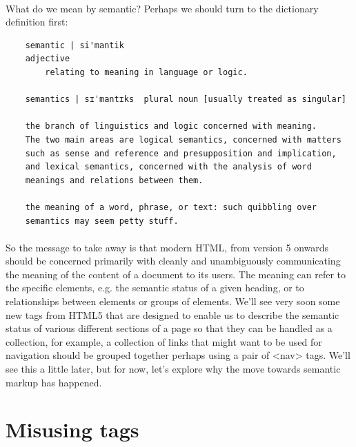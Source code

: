 \paragraph{} What do we mean by semantic? Perhaps we should turn to the dictionary definition first:
\begin{verbatim}
	semantic | si'mantik
	adjective 
		relating to meaning in language or logic. 

	semantics | sɪˈmantɪks 	plural noun [usually treated as singular] 

    the branch of linguistics and logic concerned with meaning. 
    The two main areas are logical semantics, concerned with matters 
    such as sense and reference and presupposition and implication, 
    and lexical semantics, concerned with the analysis of word 
    meanings and relations between them. 

    the meaning of a word, phrase, or text: such quibbling over 
    semantics may seem petty stuff. 
\end{verbatim}

\paragraph{} So the message to take away is that modern HTML, from version 5 onwards should be concerned primarily with cleanly and unambiguously communicating the meaning of the content of a document to its users. The meaning can refer to the specific elements, e.g. the semantic status of a given heading, or to relationships between elements or groups of elements. We'll see very soon some new tags from HTML5 that are designed to enable us to describe the semantic status of various different sections of a page so that they can be handled as a collection, for example, a collection of links that might want to be used for navigation should be grouped together perhaps using a pair of <nav> tags. We'll see this a little later, but for now, let's explore why the move towards semantic markup has happened.

\section{Misusing tags}
